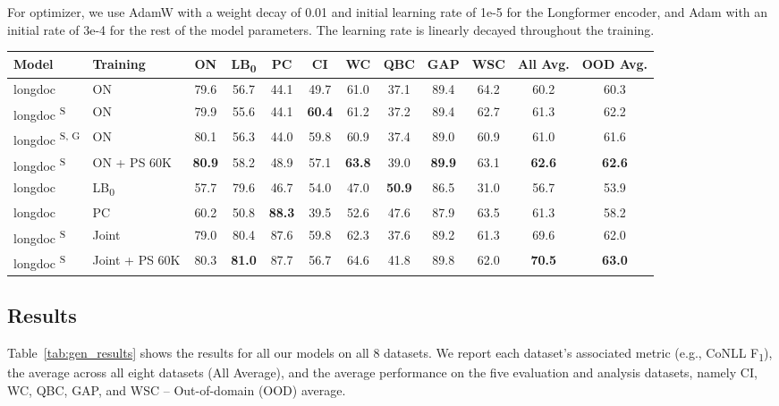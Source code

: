 \documentclass[12pt]{thesis-umich}[thesis]
\begin{document}
For optimizer, we use AdamW with a weight decay of 0.01 and initial learning rate of 1e-5 for the Longformer encoder, and Adam with an initial rate of 3e-4 for the rest of the model parameters. The learning rate is linearly decayed throughout the training.  

 \begin{table*}[t]
    \centering
    \footnotesize
    \begin{tabular}{llcccccccccc}\toprule
          Model & Training & ON & LB\textsubscript{0} & PC & CI & WC & QBC & GAP & WSC & All Avg. & OOD Avg.\\
   \midrule
        longdoc &  ON & 
        79.6 & 56.7 & 44.1 & 49.7 & 61.0 & 37.1 & 89.4 & 64.2 &  60.2& 60.3\\
        longdoc \textsuperscript{S} &  ON & 
        79.9 & 55.6 & 44.1 & \textbf{60.4} & 61.2 & 37.2 & 89.4 & 62.7 &  61.3 & 62.2\\
        longdoc \textsuperscript{S, G} &  ON  & 
        80.1 & 56.3 & 44.0 & 59.8 & 60.9 & 37.4 & 89.0 & 60.9 &  61.0 & 61.6\\
        longdoc \textsuperscript{S} &  ON + PS 60K &
        \textbf{80.9} & 58.2 & 48.9 & 57.1 & \textbf{63.8} & 39.0 & \textbf{89.9} & 63.1 &  \textbf{62.6} & \textbf{62.6}\\
        longdoc &  LB\textsubscript{0} &
        57.7 & 79.6 & 46.7 & 54.0 & 47.0 & \textbf{50.9} & 86.5 & 31.0 &  56.7 & 53.9\\
        longdoc &  PC &
        60.2 & 50.8 & \textbf{88.3} & 39.5 & 52.6 & 47.6 & 87.9 & 63.5 &  61.3 & 58.2\\
    \midrule
        longdoc \textsuperscript{S} & Joint &
         79.0 & 80.4 & 87.6 & 59.8 & 62.3 & 37.6 & 89.2 & 61.3 &  69.6 & 62.0\\
        longdoc \textsuperscript{S} & Joint + PS 60K      & 
        80.3 & \textbf{81.0} & 87.7 & 56.7 & 64.6 & 41.8 & 89.8 & 62.0 &  \textbf{70.5} & \textbf{63.0}\\
    \bottomrule
    \end{tabular}
    \caption{Performance of each model on 8 datasets measured by CoNLL F\textsubscript{1} \cite{weischedel2013ontonotes}, except for GAP (F\textsubscript{1}) and WSC (accuracy). Some models use speaker (\textsuperscript{S}) features, genre (\textsuperscript{G}) features, or pseudo-singletons (PS).} \label{tab:gen_results}
\end{table*} 

\subsection{Results}
\label{sec:gen_results}
Table~\ref{tab:gen_results} shows the results for all our models on all 8 datasets. We report each dataset's associated metric (e.g., CoNLL F\textsubscript{1}), the average across all eight datasets (All Average), and the average performance on the five evaluation and analysis datasets, namely CI, WC, QBC, GAP, and WSC -- Out-of-domain (OOD) average.
\end{document}
